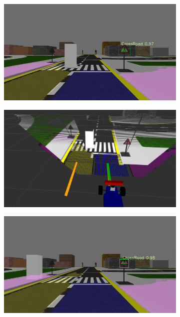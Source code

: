 \begin{figure}[h]
  \centering
  \begin{subfigure}[b]{0.45\linewidth}
      \includegraphics[width=\linewidth]{figures/experiments/cross-road-stop-img.png}
  \end{subfigure}
  \begin{subfigure}[b]{0.45\linewidth}
      \includegraphics[width=\linewidth]{figures/experiments/cross-road-stop-pc.png}
  \end{subfigure}
  \begin{subfigure}[b]{0.45\linewidth}
      \includegraphics[width=\linewidth]{figures/experiments/cross-road-go-img.png}

\end{subfigure}
\end{figure}
